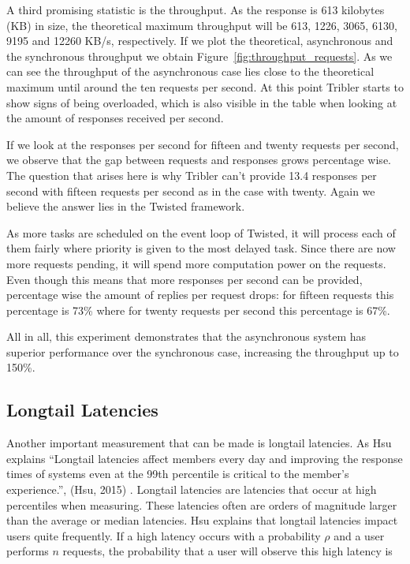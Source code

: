 A third promising statistic is the throughput.
As the response is 613 kilobytes (KB) in size, the theoretical maximum throughput will be 613, 1226, 3065, 6130, 9195 and 12260 KB/s, respectively.
If we plot the theoretical, asynchronous and the synchronous throughput we obtain Figure~\ref{fig:throughput_requests}.
As we can see the throughput of the asynchronous case lies close to the theoretical maximum until around the ten requests per second.
At this point Tribler starts to show signs of being overloaded, which is also visible in the table when looking at the amount of responses received per second.

If we look at the responses per second for fifteen and twenty requests per second, we observe that the gap between requests and responses grows percentage wise.
The question that arises here is why Tribler can't provide 13.4 responses per second with fifteen requests per second as in the case with twenty.
Again we believe the answer lies in the Twisted framework.

As more tasks are scheduled on the event loop of Twisted, it will process each of them fairly where priority is given to the most delayed task.
Since there are now more requests pending, it will spend more computation power on the requests.
Even though this means that more responses per second can be provided, percentage wise the amount of replies per request drops: for fifteen requests this percentage is 73\% where for twenty requests per second this percentage is 67\%.

All in all, this experiment demonstrates that the asynchronous system has superior performance over the synchronous case, increasing the throughput up to 150\%.

\subsection{Longtail Latencies}
\label{longtail_latencies}

Another important measurement that can be made is longtail latencies.
As Hsu explains \enquote{Longtail latencies affect members every day and improving the response times of systems even at the 99th percentile is critical to the member's experience.}, (Hsu, 2015) \cite{hsu2015who}.
Longtail latencies are latencies that occur at high percentiles when measuring.
These latencies often are orders of magnitude larger than the average or median latencies.
Hsu explains that longtail latencies impact users quite frequently.
If a high latency occurs with a probability $\rho$ and a user performs $n$ requests, the probability that a user will observe this high latency is 

